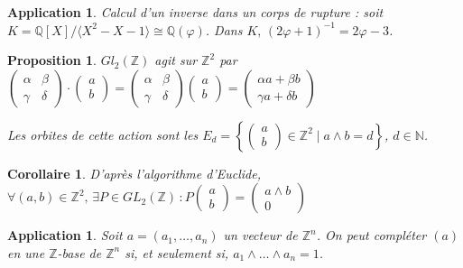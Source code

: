 \documentclass[10pt, a4paper, parskip=full, twoside, twocolumn]{report}
\newtheorem{proposition}[definition]{Proposition}
\newtheorem{corollary}[definition]{Corollaire}
\newtheorem{application}[definition]{Application}
\newcommand{\IN}{\mathbb{N}}
\newcommand{\IZ}{\mathbb{Z}}
\newcommand{\IQ}{\mathbb{Q}}
\begin{document}
\begin{application}
	Calcul d'un inverse dans un corps de rupture : soit $K = \IQ[X] / \langle X^2 -X-1\rangle \cong \IQ(\varphi)$.
	Dans $K,\, (2\varphi + 1)^{-1} = 2\varphi - 3$.
\end{application}

\begin{proposition}
	$Gl_2(\IZ)$ agit sur $\IZ^2$ par $\begin{pmatrix}
		\alpha & \beta \\ \gamma & \delta
	\end{pmatrix}\cdot \begin{pmatrix}
		a \\ b
	\end{pmatrix} = \begin{pmatrix}
		\alpha & \beta \\ \gamma & \delta
	\end{pmatrix}\begin{pmatrix}
		a \\ b
	\end{pmatrix} = \begin{pmatrix}
		\alpha a + \beta b \\ \gamma a + \delta b
	\end{pmatrix}$

	Les orbites de cette action sont les $E_d = \left\{\begin{pmatrix}
	a \\ b
	\end{pmatrix}\in \IZ^2 \mid a\wedge b = d\right\}$, $d\in \IN$.
\end{proposition}

\begin{corollary}
	D'après l'algorithme d'Euclide, $\forall (a,b)\in\IZ^2,\, \exists P\in GL_2(\IZ)\,\colon P\begin{pmatrix}
		a \\ b
	\end{pmatrix} = \begin{pmatrix}
		a\wedge b\\ 0
	\end{pmatrix}$
\end{corollary}

\begin{application}
	Soit $a = (a_1,\dots, a_n)$ un vecteur de $\IZ^n$. 
	On peut compléter $(a)$ en une $\IZ$-base de $\IZ^n$ si, et seulement si, 
	$a_1\wedge \dots \wedge a_n = 1$.
\end{application}
\end{document}
